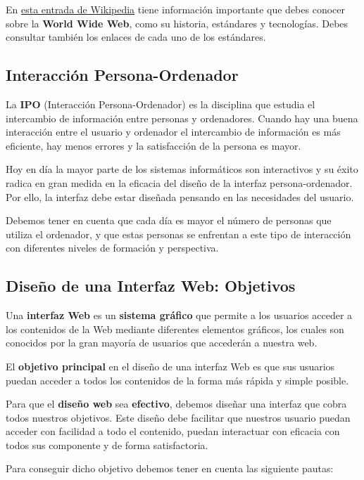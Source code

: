 En \href{https://es.wikipedia.org/wiki/World_Wide_Web}{esta entrada de Wikipedia} tiene información importante que debes conocer sobre la \textbf{World Wide Web}, como su historia, estándares y tecnologías. Debes consultar también los enlaces de cada uno de los estándares.

\subsection{Interacción Persona-Ordenador}

La \textbf{IPO} (Interacción Persona-Ordenador) es la disciplina que estudia el intercambio de información entre personas y ordenadores. Cuando hay una buena interacción entre el usuario y ordenador el intercambio de información es más eficiente, hay menos errores y la satisfacción de la persona es mayor.

Hoy en día la mayor parte de los sistemas informáticos son interactivos y su éxito radica en gran medida en la eficacia del diseño de la interfaz persona-ordenador. Por ello, la interfaz debe estar diseñada pensando en las necesidades del usuario.

Debemos tener en cuenta que cada día es mayor el número de personas que utiliza el ordenador, y que estas personas se enfrentan a este tipo de interacción con diferentes niveles de formación y perspectiva.

\subsection{Diseño de una Interfaz Web: Objetivos}
Una \textbf{interfaz Web} es un \textbf{sistema gráfico} que permite a los usuarios acceder a los contenidos de la Web mediante diferentes elementos gráficos, los cuales son conocidos por la gran mayoría de usuarios que accederán a nuestra web.

El \textbf{objetivo principal} en el diseño de una interfaz Web es que sus usuarios puedan acceder a todos los contenidos de la forma más rápida y simple posible.

Para que el \textbf{diseño web} sea \textbf{efectivo}, debemos diseñar una interfaz que cobra todos nuestros objetivos. Este diseño debe facilitar que nuestros usuario puedan acceder con facilidad a todo el contenido, puedan interactuar con eficacia con todos sus componente y de forma satisfactoria.

Para conseguir dicho objetivo debemos tener en cuenta las siguiente pautas:

